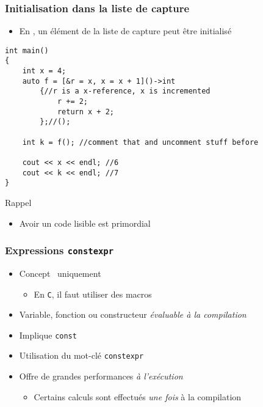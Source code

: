 \begin{frame}[containsverbatim]
\frametitle{Initialisation dans la liste de capture}
\begin{itemize}
\item En , un élément de la liste de capture peut être initialisé
\end{itemize}
\begin{lstlisting}
int main()
{
	int x = 4;
	auto f = [&r = x, x = x + 1]()->int
	    {//r is a x-reference, x is incremented
	        r += 2;
	        return x + 2;
	    };//();

	int k = f(); //comment that and uncomment stuff before

	cout << x << endl; //6
	cout << k << endl; //7
}
\end{lstlisting}
\begin{alertblock}{Rappel}
	\begin{itemize}
	\item Avoir un code lisible est primordial
	\end{itemize}
\end{alertblock}
\end{frame}

\begin{frame}
\frametitle{Expressions \texttt{constexpr}}
\begin{itemize}[<+->]
\item Concept \cpp\ uniquement
	\begin{itemize}
	\item En \texttt{C}, il faut utiliser des macros
	\end{itemize}
\item Variable, fonction ou constructeur \emph{évaluable à la compilation}
\item Implique \lstinline|const| %
\item Utilisation du mot-clé \lstinline|constexpr|
\item Offre de grandes performances \emph{à l'exécution}
	\begin{itemize}
	\item Certains calculs sont effectués \emph{une fois} à la compilation
	\end{itemize}
\end{itemize}
\end{frame}

